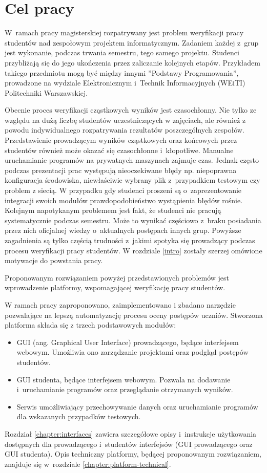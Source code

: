 \chapter{Cel pracy}

W~ramach pracy magisterskiej rozpatrywany jest problem weryfikacji pracy studentów nad zespołowym projektem informatycznym.
Zadaniem każdej z~grup jest wykonanie, podczas trwania semestru, tego samego projektu.
Studenci przybliżają się do jego ukończenia przez zaliczanie kolejnych etapów.
Przykładem takiego przedmiotu mogą być między innymi ”Podstawy Programowania”, prowadzone na wydziale Elektronicznym i~Technik Informacyjnych (WEiTI) Politechniki Warszawskiej.

Obecnie proces weryfikacji cząstkowych wyników jest czasochłonny.
Nie tylko ze względu na dużą liczbę studentów uczestniczących w zajęciach, ale również z powodu indywidualnego rozpatrywania rezultatów poszczególnych zespołów.
Przedstawienie prowadzącym wyników cząstkowych oraz końcowych przez studentów również może okazać się czasochłonne i~kłopotliwe.
Manualne uruchamianie programów na prywatnych maszynach zajmuje czas.
Jednak często podczas prezentacji prac występują nieoczekiwane błędy np. niepoprawna konfiguracja środowiska, niewłaściwie wybrany plik z~przypadkiem testowym czy problem z siecią.
W przypadku gdy studenci proszeni są o~zaprezentowanie integracji swoich modułów prawdopodobieństwo wystąpienia błędów rośnie.
Kolejnym napotykanym problemem jest fakt, że studenci nie pracują systematycznie podczas semestru.
Może to wynikać częściowo z~braku posiadania przez nich oficjalnej wiedzy o~aktualnych postępach innych grup.
Powyższe zagadnienia są tylko częścią trudności z~jakimi spotyka się prowadzący podczas procesu weryfikacji pracy studentów.
W rozdziale \ref{intro} zostały szerzej omówione motywacje do powstania pracy.

Proponowanym rozwiązaniem powyżej przedstawionych problemów jest wprowadzenie platformy, wspomagającej weryfikację pracy studentów.

W ramach pracy zaproponowano, zaimplementowano i zbadano narzędzie pozwalające na lepszą automatyzację procesu oceny postępów uczniów.
Stworzona platforma składa się z trzech podstawowych modułów:
\begin{itemize}
    \item GUI (ang. Graphical User Interface) prowadzącego, będące interfejsem webowym. Umożliwia ono zarządzanie projektami oraz podgląd postępów studentów.
    \item GUI studenta, będące interfejsem webowym. Pozwala na dodawanie i~uruchamianie programów oraz przeglądanie otrzymanych wyników.
    \item Serwis umożliwiający przechowywanie danych oraz uruchamianie programów dla wskazanych przypadków testowych.
\end{itemize}
Rozdział \ref{chapter:interfaces} zawiera szczegółowe opisy i~instrukcje użytkowania dostępnych dla prowadzącego i~studentów interfejsów (GUI prowadzącego oraz GUI studenta).
Opis techniczny platformy, będącej proponowanym rozwiązaniem, znajduje się w~rozdziale \ref{chapter:platform-technical}.

